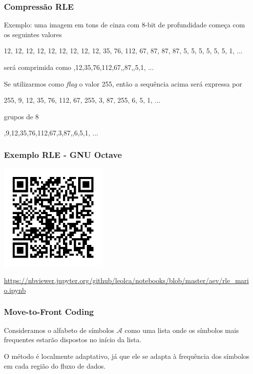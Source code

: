 \begin{frame}%
  \frametitle{Compressão RLE}
 
  Exemplo: uma imagem em tons de cinza com 8-bit de profundidade começa com os seguintes valores

  12, 12, 12, 12, 12, 12, 12, 12, 12, 35, 76, 112, 67, 87, 87, 87, 5, 5, 5, 5, 5, 5, 1, ...

  será comprimida como  ,12,35,76,112,67,,87,,5,1, ...

  \vspace{1cm}
  Se utilizarmos como \textit{flag} o valor 255, então a sequência acima será expressa por

  255, 9, 12, 35, 76, 112, 67, 255, 3, 87, 255, 6, 5, 1, ...

  \vspace{1cm}
  grupos de 8

  ,9,12,35,76,112,67,3,87,,6,5,1, ...

\end{frame} 

\begin{frame}%
  \frametitle{Exemplo RLE - GNU Octave}
  \centering
  \includegraphics[width=0.4\textwidth]{images/qrcode-jupyter-rle.pdf}

  \url{https://nbviewer.jupyter.org/github/leolca/notebooks/blob/master/aev/rle_mario.ipynb}
\end{frame} 


\begin{frame}%
  \frametitle{Move-to-Front Coding}
  Consideramos o alfabeto de símbolos $\mathcal{A}$ como uma lista 
  onde os símbolos mais frequentes estarão dispostos no início da lista.

  O método é localmente adaptativo, já que ele se adapta à frequência dos
  símbolos em cada região do fluxo de dados.
\end{frame} 


